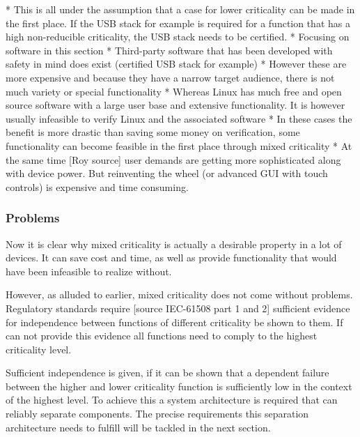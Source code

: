 * This is all under the assumption that a case for lower criticality can be made in the first place. If the USB stack for example is required for a function that has a high non-reducible criticality, the USB stack needs to be certified.
* Focusing on software in this section
* Third-party software that has been developed with safety in mind does exist (certified USB stack for example)
* However these are more expensive and because they have a narrow target audience, there is not much variety or special functionality
* Whereas Linux has much free and open source software with a large user base and extensive functionality. It is however usually infeasible to verify Linux and the associated software
* In these cases the benefit is more drastic than saving some money on verification, some functionality can become feasible in the first place through mixed criticality
* At the same time [Roy source] user demands are getting more sophisticated along with device power. But reinventing the wheel (or advanced GUI with touch controls) is expensive and time consuming.

\subsubsection{Problems}
Now it is clear why mixed criticality is actually a desirable property in a lot of devices. It can save cost and time, as well as provide functionality that would have been infeasible to realize without. 

However, as alluded to earlier, mixed criticality does not come without problems. Regulatory standards require [source IEC-61508 part 1 and 2] sufficient evidence for independence between functions of different criticality be shown to them. If \mfg{} can not provide this evidence all functions need to comply to the highest criticality level.

Sufficient independence is given, if it can be shown that a dependent failure between the higher and lower criticality function is sufficiently low in the context of the highest level.
To achieve this a system architecture is required that can reliably separate components. The precise requirements this separation architecture needs to fulfill will be tackled in the next section.


